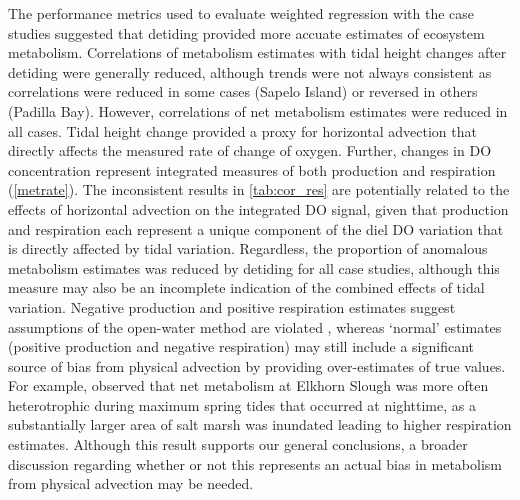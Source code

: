 \documentclass[letterpaper,12pt,oneside]{article}\usepackage[]{graphicx}\usepackage[]{color}
\begin{document}
The performance metrics used to evaluate weighted regression with the case studies suggested that detiding provided more accuate estimates of ecosystem metabolism.  Correlations of metabolism estimates with tidal height changes after detiding were generally reduced, although trends were not always consistent as correlations were reduced in some cases (Sapelo Island) or reversed in others (Padilla Bay).  However, correlations of net metabolism estimates were reduced in all cases.  Tidal height change provided a proxy for horizontal advection that directly affects the measured rate of change of oxygen.  Further, changes in \ac{DO} concentration represent integrated measures of both production and respiration (\cref{metrate}).  The inconsistent results in \cref{tab:cor_res} are potentially related to the effects of horizontal advection on the integrated \ac{DO} signal, given that production and respiration each represent a unique component of the diel \ac{DO} variation that is directly affected by tidal variation.  Regardless, the proportion of anomalous metabolism estimates was reduced by detiding for all case studies, although this measure may also be an incomplete indication of the combined effects of tidal variation.  Negative production and positive respiration estimates suggest assumptions of the open-water method are violated \citep{Needoba12}, whereas `normal' estimates (positive production and negative respiration) may still include a significant source of bias from physical advection by providing over-estimates of true values.  For example, \citet{Nidzieko14} observed that net metabolism at Elkhorn Slough was more often heterotrophic during maximum spring tides that occurred at nighttime, as a substantially larger area of salt marsh was inundated leading to higher respiration estimates.  Although this result supports our general conclusions, a broader discussion regarding whether or not this represents an actual bias in metabolism from physical advection may be needed. 
\end{document}
